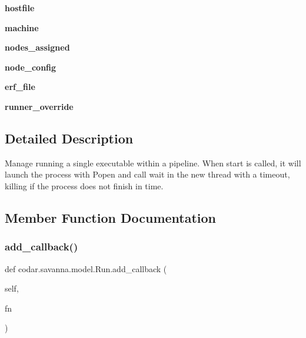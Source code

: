 \begin{DoxyCompactItemize}
{\bfseries hostfile}
\item 
\mbox{\label{classcodar_1_1savanna_1_1model_1_1_run_a7cb03aedcb50de3ed5a9edf3b8d51ef0}} 
{\bfseries machine}
\item 
\mbox{\label{classcodar_1_1savanna_1_1model_1_1_run_a83e17439a9119f1666bc8fbd6e5051e4}} 
{\bfseries nodes\+\_\+assigned}
\item 
\mbox{\label{classcodar_1_1savanna_1_1model_1_1_run_aaebbd098b2bb5d929e0b85a71d408c31}} 
{\bfseries node\+\_\+config}
\item 
\mbox{\label{classcodar_1_1savanna_1_1model_1_1_run_ab4b12fcc794061a18c7dca681c69389a}} 
{\bfseries erf\+\_\+file}
\item 
\mbox{\label{classcodar_1_1savanna_1_1model_1_1_run_a687ceaaa3bd97a392487ea57b662e7a3}} 
{\bfseries runner\+\_\+override}
\end{DoxyCompactItemize}


\subsection{Detailed Description}
\begin{DoxyVerb}Manage running a single executable within a pipeline. When start is
called, it will launch the process with Popen and call wait in the new
thread with a timeout, killing if the process does not finish in time.\end{DoxyVerb}
 

\subsection{Member Function Documentation}
\mbox{\label{classcodar_1_1savanna_1_1model_1_1_run_a73899dead2dbe21ee0242edf9e21515d}} 
\subsubsection{\texorpdfstring{add\+\_\+callback()}{add\_callback()}}
{\footnotesize\ttfamily def codar.\+savanna.\+model.\+Run.\+add\+\_\+callback (\begin{DoxyParamCaption}\item[{}]{self,  }\item[{}]{fn }\end{DoxyParamCaption})}

